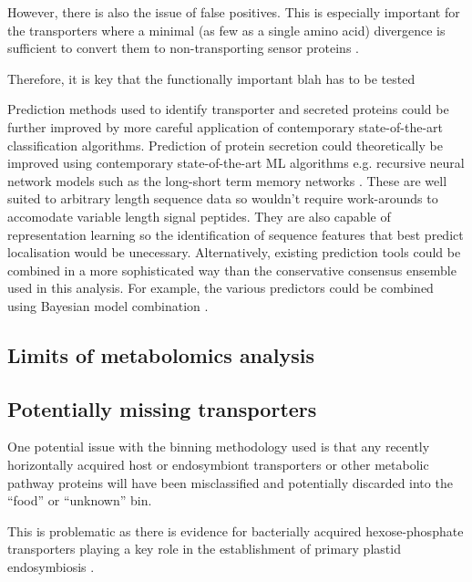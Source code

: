 However, there is also the issue of false positives. 
This is especially important for the transporters where a minimal (as few as
a single amino acid) divergence is sufficient to convert them to non-transporting
sensor proteins \citep{Lalonde1999,Bianchi2010}.


Therefore, it is key that the functionally important 
blah has to be tested



Prediction methods used to identify
transporter and secreted proteins 
could be further improved by more careful 
application of contemporary state-of-the-art classification
algorithms. 
Prediction of protein secretion could theoretically be improved
using contemporary state-of-the-art ML algorithms e.g. recursive
neural network models such as the long-short term memory networks 
\citep{Hochreiter1997,Greff2015}.
These are well suited to arbitrary length sequence data so wouldn't 
require work-arounds to accomodate variable length signal 
peptides.  They are also capable of representation learning
so the identification of sequence features that best
predict localisation would be unecessary. 
Alternatively, existing prediction tools could be combined
in a more sophisticated way than the conservative consensus
ensemble used in this analysis.  For example,
the various predictors could be combined using Bayesian
model combination \citep{Monteith2011}.







\subsection{Limits of metabolomics analysis}






\subsection{Potentially missing transporters}

One potential issue with the binning methodology used is
that any recently horizontally acquired host or endosymbiont 
transporters or other metabolic pathway proteins will have been misclassified
and potentially discarded into the ``food'' or ``unknown'' bin.

This is problematic as there is evidence for bacterially acquired 
hexose-phosphate transporters playing a key role in the 
establishment of primary plastid endosymbiosis \citep{Price2012,Karkar2015a}.

